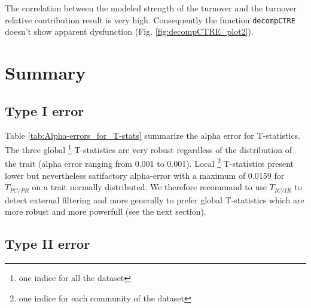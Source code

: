 \documentclass[12pt]{article}\usepackage[]{graphicx}\usepackage[]{color}
\begin{document}
The correlation between the modeled strength of the turnover and the turnover relative contribution result is very high. Consequently the function \texttt{decompCTRE} doesn't show apparent dysfunction (Fig. \ref{fig:decompCTRE_plot2}).

\cleardoublepage


\section{Summary}
\label{sect:summary}

\subsection{Type I error}

Table \ref{tab:Alpha-errors_for_T-stats} summarize the alpha error for T-statistics. The three global \footnote{one indice for all the dataset} T-statistics are very robust 
regardless of the distribution of the trait (alpha error ranging from 0.001 to 0.001). Local \footnote{one indice for each community of the dataset} T-statistics present lower but nevertheless satifactory alpha-error with a maximum of 0.0159 for $T_{PC/PR}$ on a trait normally distributed. We therefore recommand to use $T_{IC/IR}$ to detect external filtering and more generally to prefer global T-statistics which are more robust and more powerfull (see the next section).


\subsection{Type II error}
\end{document}
